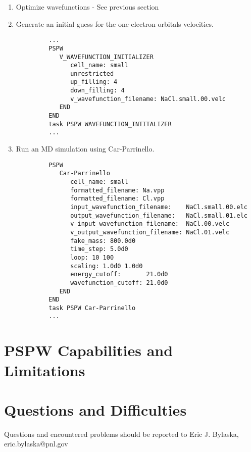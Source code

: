 \begin{enumerate}
\item Optimize wavefunctions - See previous section

\normalsize
\item Generate an initial guess for the one-electron orbitals velocities.
\tiny   \begin{verbatim}
         ...
         PSPW
            V_WAVEFUNCTION_INITIALIZER
               cell_name: small
               unrestricted
               up_filling: 4
               down_filling: 4
               v_wavefunction_filename: NaCl.small.00.velc
            END
         END
         task PSPW WAVEFUNCTION_INTITALIZER
         ...
   \end{verbatim}
\normalsize
\item Run an MD simulation using Car-Parrinello.
\tiny \begin{verbatim}
         PSPW
            Car-Parrinello
               cell_name: small
               formatted_filename: Na.vpp
               formatted_filename: Cl.vpp
               input_wavefunction_filename:    NaCl.small.00.elc
               output_wavefunction_filename:   NaCl.small.01.elc
               v_input_wavefunction_filename:  NaCl.00.velc
               v_output_wavefunction_filename: NaCl.01.velc
               fake_mass: 800.0d0
               time_step: 5.0d0
               loop: 10 100
               scaling: 1.0d0 1.0d0
               energy_cutoff:       21.0d0
               wavefunction_cutoff: 21.0d0
            END 
         END
         task PSPW Car-Parrinello
         ...
      \end{verbatim}


\end{enumerate}
\normalsize


\section{PSPW Capabilities and Limitations}
\label{sec:pspw_limits}



\section{Questions and Difficulties}

Questions and encountered problems should be reported to 
Eric J. Bylaska, eric.bylaska@pnl.gov




